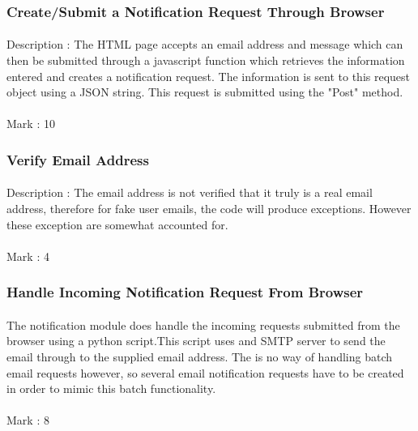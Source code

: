\documentclass[11pt]{article}
\begin{document}
\subsubsection{Create/Submit a Notification Request Through Browser} 
\paragraph{}Description : The HTML page accepts an email address and message which can then be submitted through a javascript function which retrieves the information entered and creates a notification request. The information is sent to this request object using a JSON string. This request is submitted using the "Post" method.
\paragraph{} Mark : 10

\subsubsection{Verify Email Address} 
\paragraph{}Description : The email address is not verified that it truly is a real email address, therefore for fake user emails, the code will produce exceptions. However these exception are somewhat accounted for.
\paragraph{} Mark : 4

\subsubsection{Handle Incoming Notification Request From Browser}
\paragraph{} The notification module does handle the incoming requests submitted from the browser using a python script.This script uses and SMTP server to send the email through to the supplied email address. The is no way of handling batch email requests however, so several email notification requests have to be created in order to mimic this batch functionality.
\paragraph{} Mark : 8
\end{document}

